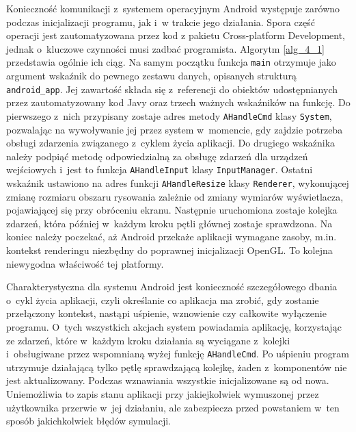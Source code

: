 		Konieczność komunikacji z~systemem operacyjnym Android występuje zarówno podczas inicjalizacji programu, jak i~w trakcie jego działania. Spora część operacji jest zautomatyzowana przez kod z pakietu Cross-platform Development, jednak o~kluczowe czynności musi zadbać programista. Algorytm \ref{alg_4_1} przedstawia ogólnie ich ciąg. Na samym początku funkcja \texttt{main} otrzymuje jako argument wskaźnik do pewnego zestawu danych, opisanych strukturą \texttt{android\_app}. Jej zawartość składa się z~referencji do obiektów udostępnianych przez zautomatyzowany kod Javy oraz trzech ważnych wskaźników na funkcję. Do pierwszego z~nich przypisany zostaje adres metody \texttt{AHandleCmd} klasy \texttt{System}, pozwalając na wywoływanie jej przez system w~momencie, gdy zajdzie potrzeba obsługi zdarzenia związanego z~cyklem życia aplikacji. Do drugiego wskaźnika należy podpiąć metodę odpowiedzialną za obsługę zdarzeń dla urządzeń wejściowych i~jest to funkcja \texttt{AHandleInput} klasy \texttt{InputManager}. Ostatni wskaźnik ustawiono na adres funkcji \texttt{AHandleResize} klasy \texttt{Renderer}, wykonującej zmianę rozmiaru obszaru rysowania zależnie od zmiany wymiarów wyświetlacza, pojawiającej się przy obróceniu ekranu. Następnie uruchomiona zostaje kolejka zdarzeń, która później w~każdym kroku pętli głównej zostaje sprawdzona. Na koniec należy poczekać, aż Android przekaże aplikacji wymagane zasoby, m.in. kontekst renderingu niezbędny do poprawnej inicjalizacji OpenGL. To kolejna niewygodna właściwość tej platformy.
		
		Charakterystyczna dla systemu Android jest konieczność szczegółowego dbania o~cykl życia aplikacji, czyli określanie co aplikacja ma zrobić, gdy zostanie przełączony kontekst, nastąpi uśpienie, wznowienie czy całkowite wyłączenie programu. O~tych wszystkich akcjach system powiadamia aplikację, korzystając ze zdarzeń, które w~każdym kroku działania są wyciągane z~kolejki i~obsługiwane przez wspomnianą wyżej funkcję \texttt{AHandleCmd}. Po uśpieniu program utrzymuje działającą tylko pętlę sprawdzającą kolejkę, żaden z~komponentów nie jest aktualizowany. Podczas wznawiania wszystkie inicjalizowane są od nowa. Uniemożliwia to zapis stanu aplikacji przy jakiejkolwiek wymuszonej przez użytkownika przerwie w~jej działaniu, ale zabezpiecza przed powstaniem w~ten sposób jakichkolwiek błędów symulacji.
		
